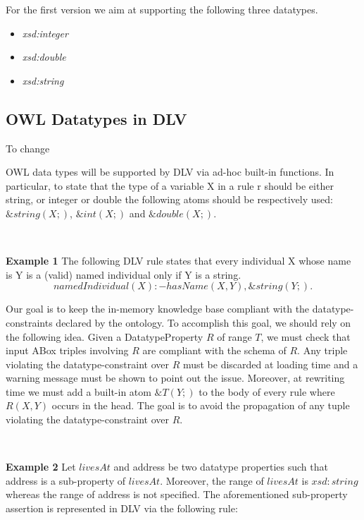 \documentclass[oneside]{book}
\begin{document}
For the first version we aim at supporting the following three datatypes.

\begin{itemize}
	\item \textit{xsd:integer}
	\item \textit{xsd:double}
	\item \textit{xsd:string}
\end{itemize}




\subsection{OWL Datatypes in DLV}

To change

OWL data types will be supported by DLV via ad-hoc built-in functions. In particular, to state that the type of a variable X in a rule r should be either string, or integer or double the following atoms should be respectively used: $\&string(X;)$, $\&int(X;)$ and $\&double(X;)$. 

\

\textbf{Example 1}
The following DLV rule states that every individual X whose name is Y is a (valid) named individual only if Y is a string.
\[
namedIndividual(X) :- hasName(X,Y), \&string(Y;).
\]

Our goal is to keep the in-memory knowledge base compliant with the datatype-constraints declared by the ontology. To accomplish this goal, we should rely on the following idea. Given a DatatypeProperty $R$ of range $T$, we must check that input ABox triples involving $R$ are compliant with the schema of $R$. Any triple violating the datatype-constraint over $R$ must be discarded at loading time and a warning message must be shown to point out the issue. Moreover, at rewriting time we must add a built-in atom $\&T(Y;)$ to the body of every rule where $R(X,Y)$ occurs in the head. The goal is to avoid the propagation of any tuple violating the datatype-constraint over $R$.

\

\textbf{Example 2}
Let $livesAt$ and address be two datatype properties such that address is a sub-property of $livesAt$. Moreover, the range of $livesAt$ is $xsd:string$ whereas the range of address is not specified. The aforementioned sub-property assertion is represented in DLV via the following rule:
\end{document}
